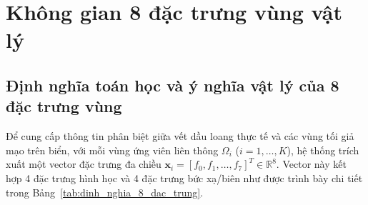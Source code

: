 \section{Không gian 8 đặc trưng vùng vật lý}
\label{sec:khong_gian_dac_trung}

\subsection{Định nghĩa toán học và ý nghĩa vật lý của 8 đặc trưng vùng}

Để cung cấp thông tin phân biệt giữa vết dầu loang thực tế và các vùng tối giả mạo trên biển, với mỗi vùng ứng viên liên thông $\Omega_i$ ($i = 1, \dots, K$), hệ thống trích xuất một vector đặc trưng đa chiều $\mathbf{x}_i = [f_0, f_1, \dots, f_7]^T \in \mathbb{R}^8$. Vector này kết hợp 4 đặc trưng hình học và 4 đặc trưng bức xạ/biên như được trình bày chi tiết trong Bảng~\ref{tab:dinh_nghia_8_dac_trung}.

